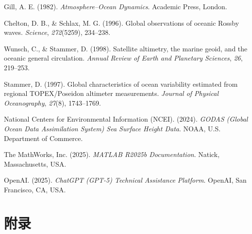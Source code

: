 \documentclass[UTF8]{article}
\begin{document}
\begin{thebibliography}{99}
Gill, A. E. (1982).
\textit{Atmosphere–Ocean Dynamics}.
Academic Press, London.

Chelton, D. B., \& Schlax, M. G. (1996).
Global observations of oceanic Rossby waves.
\textit{Science}, \textit{272}(5259), 234–238.

Wunsch, C., \& Stammer, D. (1998).
Satellite altimetry, the marine geoid, and the oceanic general circulation.
\textit{Annual Review of Earth and Planetary Sciences}, \textit{26}, 219–253.

Stammer, D. (1997).
Global characteristics of ocean variability estimated from regional TOPEX/Poseidon altimeter measurements.
\textit{Journal of Physical Oceanography}, \textit{27}(8), 1743–1769.

National Centers for Environmental Information (NCEI). (2024).
\textit{GODAS (Global Ocean Data Assimilation System) Sea Surface Height Data}.
NOAA, U.S. Department of Commerce.

The MathWorks, Inc. (2025).
\textit{MATLAB R2025b Documentation}.
Natick, Massachusetts, USA.

OpenAI. (2025).
\textit{ChatGPT (GPT-5) Technical Assistance Platform}.
OpenAI, San Francisco, CA, USA.

\end{thebibliography}


\section*{附录}
\end{document}
